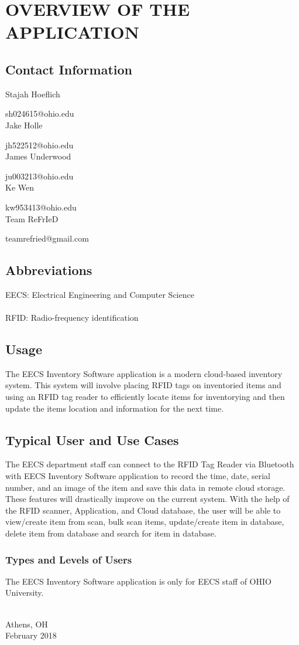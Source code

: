 \chapter{OVERVIEW OF THE APPLICATION}

\section{Contact Information}

Stajah Hoeflich 

\noindent
sh024615@ohio.edu
~\\

\noindent
Jake Holle 

\noindent
jh522512@ohio.edu
~\\

\noindent
James Underwood 

\noindent
ju003213@ohio.edu
~\\

\noindent
Ke Wen

\noindent
kw953413@ohio.edu
~\\

\noindent
Team ReFrIeD

\noindent
teamrefried@gmail.com



\section{Abbreviations}

EECS: Electrical Engineering and Computer Science
~\\
~\\
\noindent
RFID: Radio-frequency identification

\section{Usage}
The EECS Inventory Software application is a modern cloud-based inventory system. This system will involve placing RFID tags on inventoried items and using an RFID tag reader to efficiently locate items for inventorying and then update the items location and information for the next time.

\clearpage
\section{Typical User and Use Cases}

The EECS department staff can connect to the RFID Tag Reader via Bluetooth with EECS Inventory Software application to record the time, date, serial number, and an image of the item and save this data in remote cloud storage. These features will drastically improve on the current system. With the help of the RFID scanner, Application, and Cloud database, the user will be able to view/create item from scan, bulk scan items, update/create item in database, delete item from database and search for item in database.

\subsection{Types and Levels of Users }
The EECS Inventory Software application is only for EECS staff of OHIO University.


\vspace*{\fill}
{ \\ Athens, OH \\ February 2018\par}
